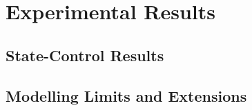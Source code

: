 
\section{Experimental Results}
\label{sec:results}

\subsection{State-Control Results}

\subsection{Modelling Limits and Extensions}